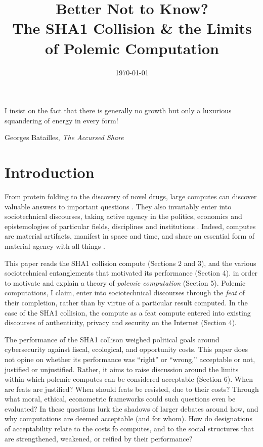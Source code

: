 \documentclass[sigconf]{acmart}
\date{\today}
\title{Better Not to Know?\\\medskip
\large The SHA1 Collision \& the Limits of Polemic Computation}
\begin{document}
\maketitle

\epigraph{I insist on the fact that there is generally no growth but only a luxurious squandering of energy in every form!}{Georges Batailles, \textit{The Accursed Share}}


\section{Introduction}
\label{sec:org75eddc9}

From protein folding to the discovery of novel drugs,
large computes can discover valuable answers to important questions
\cite{Anderson2004}.
They also invariably enter into sociotechnical discourses,
taking active agency in the politics, economics and epistemologies 
of particular fields, disciplines and institutions \cite{Ames2015}.
Indeed, computes are material artifacts, manifest in space and time,
and share an essential form of material agency with all things \cite{Bennett2013a,Winner2003}.

This paper reads the SHA1 collision compute (Sections 2 and 3), 
and the various sociotechnical entanglements that motivated its performance (Section 4).
in order to motivate and explain a theory of \emph{polemic computation} (Section 5).
Polemic computations, I claim, enter into sociotechnical discourses through the \emph{feat} of their completion, rather than by virtue of a particular result computed.
In the case of the SHA1 collision, the compute as a feat compute entered into existing discourses of authenticity, privacy and security on the Internet (Section 4).

The performance of the SHA1 collison weighed political goals around cybersecurity against fiscal, ecological, and opportunity costs.
This paper does not opine on whether its performance was ``right'' or ``wrong,'' acceptable or not, justified or unjustified.
Rather, it aims to raise discussion around the limits within which polemic computes can be considered acceptable (Section 6).
When are feats are justified? 
When should feats be resisted, due to their costs? 
Through what moral, ethical, econometric frameworks could such questions even be evaluated? 
In these questions lurk the shadows of larger debates around how, and why computations are deemed acceptable (and for whom).
How do designations of acceptability relate to the costs fo computes, and to the social structures that are strengthened, weakened, or reified by their performance?
\end{document}
